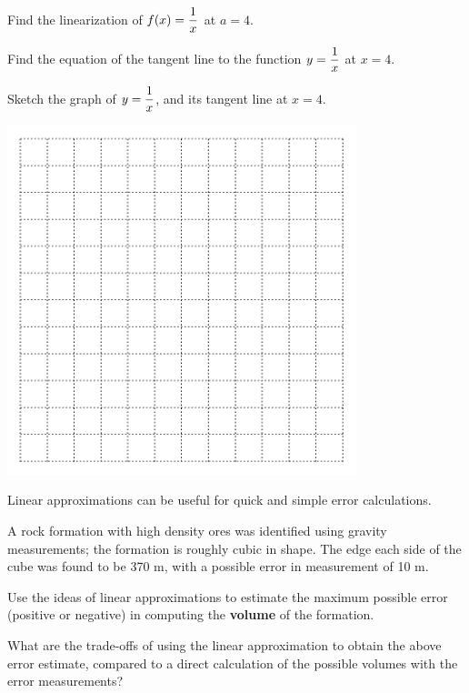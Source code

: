 \newpage
\begin{problem}
 Find the linearization of $\displaystyle f(x)=\frac{1}{x}$ at $a=4$.
\end{problem}
\vfill
\vfill

Find the equation of the tangent line to the function
$\displaystyle y=\frac{1}{x} $ at $x=4$.  \vfill

\newpage

\problem Sketch the graph of $\displaystyle y=\frac{1}{x}$, and its tangent line at $x=4$. 

\includegraphics[width=4in]{graphics/empty_graph_square_12}


\newpage
{} Linear
approximations can be useful for quick and simple error calculations.

\begin{problem}
  A rock formation with high density ores was identified using gravity
  measurements; the formation is roughly cubic in shape. The edge each
  side of the cube was found to be 370 m, with a possible error in
  measurement of 10 m.  

  Use the ideas of linear approximations to estimate the maximum
  possible error (positive or negative) in computing the {\bf volume}
  of the formation.
\end{problem}
	\vfill
	\vfill

\newpage
\problem What are the trade-offs of using the linear approximation to
obtain the above error estimate, compared to a direct calculation of
the possible volumes with the error measurements?  \vfill



